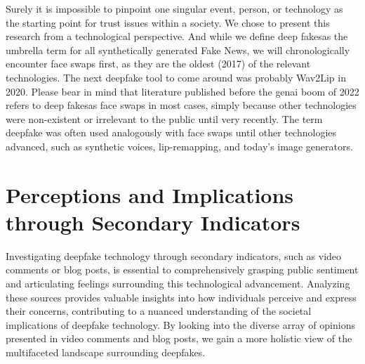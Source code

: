 \documentclass[
  a4paper,  %
  twoside,  %
  bibliography=totoc,
  headsepline,
  cleardoublepage=empty,
  parskip=half,
  draft=false
]{scrbook}
\begin{document}
Surely it is impossible to pinpoint one singular event, person, or technology as the starting point for trust issues within a society. We chose to present this research from a technological perspective. And while we define deep fakesas the umbrella term for all synthetically generated Fake News, we will chronologically encounter face swaps first, as they are the oldest (2017) of the relevant technologies. The next deepfake tool to come around was probably Wav2Lip in 2020. Please bear in mind that literature published before the \gls{genai} boom of 2022 refers to deep fakesas face swaps in most cases, simply because other technologies were non-existent or irrelevant to the public until very recently. The term deepfake was often used analogously with face swaps until other technologies advanced, such as synthetic voices, lip-remapping, and today's image generators.

\section{Perceptions and Implications through Secondary Indicators} 
\label{sec:rel-secondary}

Investigating deepfake technology through secondary indicators, such as video comments or blog posts, is essential to comprehensively grasping public sentiment and articulating feelings surrounding this technological advancement. Analyzing these sources provides valuable insights into how individuals perceive and express their concerns, contributing to a nuanced understanding of the societal implications of deepfake technology. By looking into the diverse array of opinions presented in video comments and blog posts, we gain a more holistic view of the multifaceted landscape surrounding deepfakes.
\end{document}
